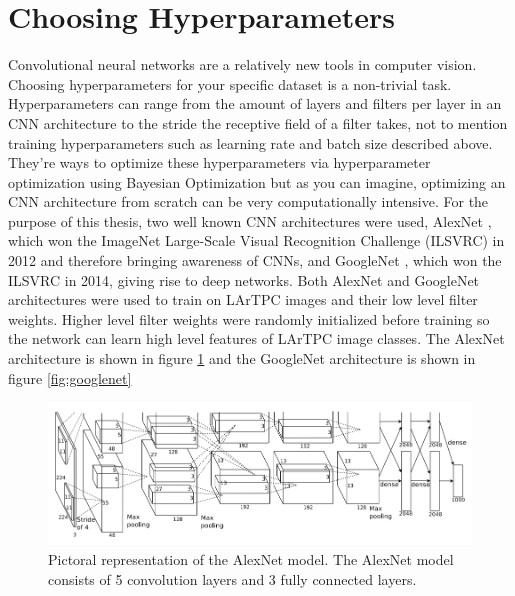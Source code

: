 \section{Choosing Hyperparameters}
Convolutional neural networks are a relatively new tools in computer vision. Choosing hyperparameters for your specific dataset is a non-trivial task. Hyperparameters can range from the amount of layers and filters per layer in an CNN architecture to the stride the receptive field of a filter takes, not to mention training hyperparameters such as learning rate and batch size described above. They're ways to optimize these hyperparameters via hyperparameter optimization using Bayesian Optimization \cite{optimization} but as you can imagine, optimizing an CNN architecture from scratch can be very computationally intensive. For the purpose of this thesis, two well known CNN architectures were used, AlexNet \cite{alexnet}, which won the ImageNet Large-Scale Visual Recognition Challenge (ILSVRC) in 2012 and therefore bringing awareness of CNNs, and GoogleNet \cite{googlenet}, which won the ILSVRC in 2014, giving rise to deep networks. Both AlexNet and GoogleNet architectures were used to train on LArTPC images and their low level filter weights. Higher level filter weights were randomly initialized before training so the network can learn high level features of LArTPC image classes. The AlexNet architecture is shown in figure \ref{fig:alexnet} and the GoogleNet architecture is shown in figure \ref{fig:googlenet}

\begin{figure}[htp!]
\centering
\includegraphics[width=0.9\linewidth]{figs/alexnet.png}
\caption{Pictoral representation of the AlexNet model. The AlexNet model consists of 5 convolution layers and 3 fully connected layers.}
\label{fig:alexnet}
\end{figure}

